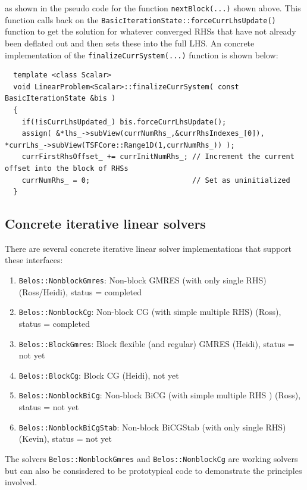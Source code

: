 \documentclass[pdf,ps2pdf,11pt]{SANDreport}
\begin{document}
\begin{enumerate}
{}\noindent{}as shown in the pseudo code for the function
{}\texttt{nextBlock(...)} shown above.  This function calls back on
the {}\texttt{Basic\-Iteration\-State\-::force\-Curr\-Lhs\-Update()}
function to get the solution for whatever converged RHSs that have not
already been deflated out and then sets these into the full LHS.  An
concrete implementation of the
{}\texttt{finalize\-Curr\-System(...)} function is shown below:

{\scriptsize\begin{verbatim}
  template <class Scalar>
  void LinearProblem<Scalar>::finalizeCurrSystem( const BasicIterationState &bis )
  {
    if(!isCurrLhsUpdated_) bis.forceCurrLhsUpdate();
    assign( &*lhs_->subView(currNumRhs_,&currRhsIndexes_[0]), *currLhs_->subView(TSFCore::Range1D(1,currNumRhs_)) );
    currFirstRhsOffset_ += currInitNumRhs_; // Increment the current offset into the block of RHSs
    currNumRhs_ = 0;                        // Set as uninitialized
  }
\end{verbatim}}

\end{enumerate}

\subsection{Concrete iterative linear solvers}

There are several concrete iterative linear solver implementations
that support these interfaces:

\begin{enumerate}
\item {}\texttt{Belos::NonblockGmres}: Non-block GMRES (with only single RHS) (Ross/Heidi), status = completed
\item {}\texttt{Belos::NonblockCg}: Non-block CG (with simple multiple RHS) (Ross), status = completed
\item {}\texttt{Belos::BlockGmres}: Block flexible (and regular) GMRES (Heidi), status = not yet
\item {}\texttt{Belos::BlockCg}: Block CG (Heidi), not yet
\item {}\texttt{Belos::NonblockBiCg}: Non-block BiCG (with simple multiple RHS ) (Ross), status = not yet
\item {}\texttt{Belos::NonblockBiCgStab}: Non-block BiCGStab (with only single RHS) (Kevin), status = not yet
\end{enumerate}

The solvers {}\texttt{Belos::NonblockGmres} and
{}\texttt{Belos::NonblockCg} are working solvers but can also be
consisdered to be prototypical code to demonstrate the principles
involved.
\end{document}
